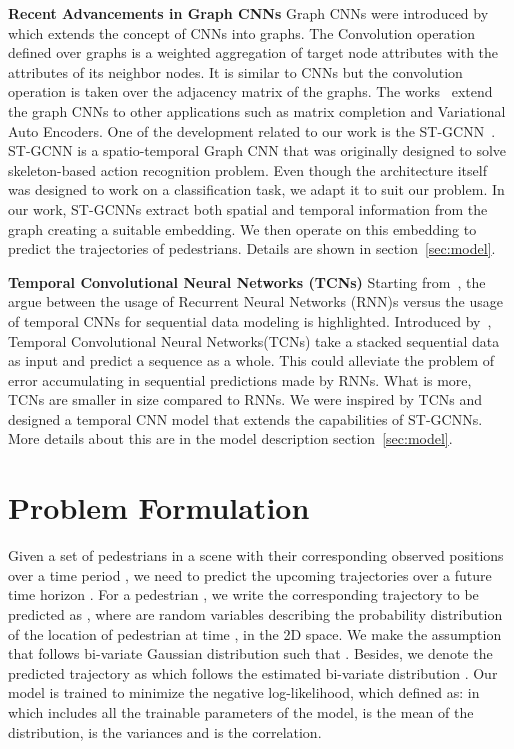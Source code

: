 \documentclass[10pt,twocolumn,letterpaper]{article}
\begin{document}
\noindent
\textbf{Recent Advancements in Graph CNNs} Graph CNNs were introduced by~\cite{kipf2016semi} which extends the concept of CNNs into graphs. The Convolution operation defined over graphs is a weighted aggregation of target node attributes with the attributes of its neighbor nodes. It is similar to CNNs but the convolution operation is taken over the adjacency matrix of the graphs. The works~\cite{kipf2016variational, berg2017graph, schlichtkrull2018modeling} extend the graph CNNs to other applications such as matrix completion and Variational Auto Encoders. One of the development related to our work is the ST-GCNN~\cite{yan2018spatial}. ST-GCNN is a spatio-temporal Graph CNN that was originally designed to solve skeleton-based action recognition problem. Even though the architecture itself was designed to work on a classification task, we adapt it to suit our problem. In our work, ST-GCNNs extract both spatial and temporal information from the graph creating a suitable embedding. We then operate on this embedding to predict the trajectories of pedestrians. Details are shown in section~\ref{sec:model}.

\noindent
\textbf{Temporal Convolutional Neural Networks (TCNs)}
Starting from~\cite{bai2018empirical}, the argue between the usage of Recurrent Neural Networks (RNN)s versus the usage of temporal CNNs for sequential data modeling is highlighted. Introduced by~\cite{bai2018empirical}, Temporal Convolutional Neural Networks(TCNs) take a stacked sequential data as input and predict a sequence as a whole. This could alleviate the problem of error accumulating in sequential predictions made by RNNs. What is more, TCNs are smaller in size compared to RNNs. We were inspired by TCNs and designed a temporal CNN model that extends the capabilities of ST-GCNNs. More details about this are in the model description section~\ref{sec:model}.



\section{Problem Formulation}
\label{sec:formulation}
Given a set of  pedestrians in a scene with their corresponding observed positions  over a time period , we need to predict the upcoming trajectories  over a future time horizon . For a pedestrian , we write the corresponding trajectory to be predicted as , where  are random variables describing the probability distribution of the location of pedestrian  at time , in the 2D space. We make the assumption that  follows bi-variate Gaussian distribution such that . Besides, we denote the predicted trajectory as  which follows the estimated bi-variate distribution . Our model is trained to minimize the negative log-likelihood, which defined as:
{}
in which  includes all the trainable parameters of the model,  is the mean of the distribution, is the variances and  is the correlation.
\end{document}
